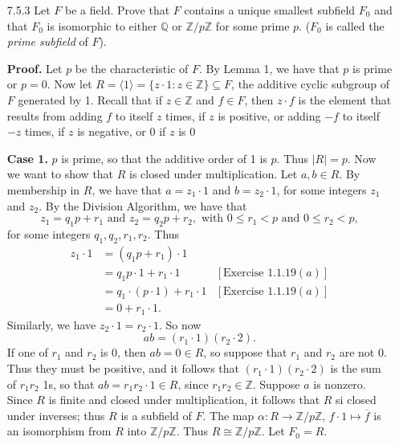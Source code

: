 \documentclass[9pt]{article}
\newcommand{\cyc}[1]{\langle #1 \rangle}
\newcommand{\Z}{\mathbb{Z}}
\newcommand{\Q}{\mathbb{Q}}
\begin{document}
\begin{enumerate}
   \item[7.5.3]   Let $F$ be a field. Prove that $F$ contains a unique smallest
                  subfield $F_0$ and that $F_0$ is isomorphic to either $\Q$ or
                  $\Z/p\Z$ for some prime $p$. ($F_0$ is called the
                  \textit{prime subfield} of $F$).
                  
      \textbf{Proof.} Let $p$ be the characteristic of $F$. By Lemma 1, we have
      that $p$ is prime or $p = 0$. Now let
      $R = \cyc{1} = \{ z \cdot 1: z \in \Z\} \subseteq F$, the additive
      cyclic subgroup of $F$ generated by 1. Recall that if $z \in \Z$ and
      $f \in F$, then $z \cdot f$ is the element that results from adding $f$ to itself $z$
      times, if $z$ is positive, or adding $-f$ to itself $-z$ times, if $z$ is
      negative, or 0 if $z$ is 0
      
      \textbf{Case 1.} $p$ is prime, so that the additive order of 1 is $p$.
      Thus $|R| = p$. Now we want to show that $R$ is closed
      under multiplication. Let $a, b \in R$. By membership in $R$, we have
      that $a = z_1 \cdot 1$ and $b = z_2 \cdot 1$, for some integers $z_1$ and
      $z_2$. By the Division Algorithm, we have that
      $$z_1 = q_1p + r_1 \text{ and } z_2 = q_2p + r_2, \text{ with }
        0 \le r_1 < p \text{ and } 0 \le r_2 < p,$$
      for some integers $q_1, q_2, r_1, r_2$. Thus
      \begin{align*}
         z_1 \cdot 1 &= (q_1p + r_1) \cdot 1 \\
            &= q_1p \cdot 1 + r_1 \cdot 1 &[\text{Exercise }1.1.19(a)] \\
            &= q_1 \cdot (p \cdot 1) + r_1 \cdot 1 &[\text{Exercise }1.1.19(a)]\\
            &= 0 + r_1 \cdot 1.
      \end{align*}
      Similarly, we have $z_2 \cdot 1 = r_2 \cdot 1$. So now
      $$ab = (r_1 \cdot 1)(r_2 \cdot 2).$$
      If one of $r_1$ and $r_2$ is 0, then $ab = 0 \in R$, so suppose that
      $r_1$ and $r_2$ are not 0. Thus they must be positive, and it follows that
      $(r_1 \cdot 1)(r_2 \cdot 2)$ is the sum of $r_1r_2$ 1s, so that
      $ab = r_1r_2 \cdot 1 \in R$, since $r_1r_2 \in \Z$. Suppose $a$ is
      nonzero. Since $R$ is finite and closed under multiplication, it follows
      that $R$ si closed under inverses; thus $R$ is a subfield of $F$. The map
      $\alpha : R \rightarrow \Z/p\Z$, $f \cdot 1 \mapsto \overline{f}$ is an
      isomorphism from $R$ into $\Z/p\Z$. Thus $R \cong \Z/p\Z$. Let $F_0 = R$. 
      

\end{enumerate}
\end{document}
